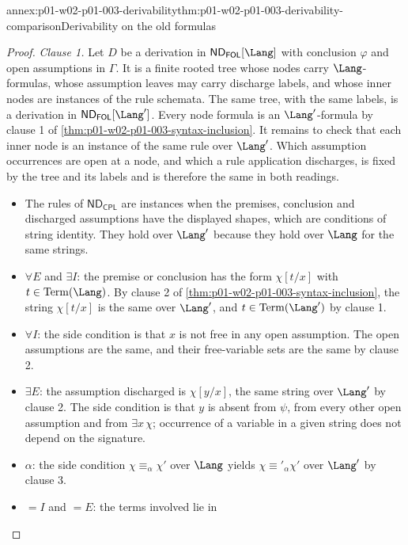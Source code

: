 \begin{annexitem}{annex:p01-w02-p01-003-derivability}{thm:p01-w02-p01-003-derivability-comparison}{Derivability on the old formulas}
\begin{proof}
\emph{Clause 1.} Let \(D\) be a derivation in
\(\mathsf{ND}_{\mathsf{FOL}}[\Lang]\) with conclusion \(\varphi\) and open
assumptions in \(\Gamma\). It is a finite rooted tree whose nodes carry
\(\Lang\)-formulas, whose assumption leaves may carry discharge labels, and
whose inner nodes are instances of the rule schemata. The same tree, with the
same labels, is a derivation in \(\mathsf{ND}_{\mathsf{FOL}}[\Lang']\). Every
node formula is an \(\Lang'\)-formula by clause 1 of
\cref{thm:p01-w02-p01-003-syntax-inclusion}. It remains to check that each
inner node is an instance of the same rule over \(\Lang'\). Which assumption
occurrences are open at a node, and which a rule application discharges, is
fixed by the tree and its labels and is therefore the same in both readings.
\begin{itemize}
  \item The rules of \(\mathsf{ND}_{\mathsf{CPL}}\) are instances when the
        premises, conclusion and discharged assumptions have the displayed
        shapes, which are conditions of string identity. They hold over
        \(\Lang'\) because they hold over \(\Lang\) for the same strings.
  \item \(\forall E\) and \(\exists I\): the premise or conclusion has the
        form \(\chi[t/x]\) with \(t\in\operatorname{Term}(\Lang)\). By
        clause 2 of \cref{thm:p01-w02-p01-003-syntax-inclusion}, the string
        \(\chi[t/x]\) is the same over \(\Lang'\), and
        \(t\in\operatorname{Term}(\Lang')\) by clause 1.
  \item \(\forall I\): the side condition is that \(x\) is not free in any
        open assumption. The open assumptions are the same, and their
        free-variable sets are the same by clause 2.
  \item \(\exists E\): the assumption discharged is \(\chi[y/x]\), the
        same string over \(\Lang'\) by clause 2. The side condition is that
        \(y\) is absent from \(\psi\), from every other open assumption and
        from \(\exists x\,\chi\); occurrence of a variable in a given string
        does not depend on the signature.
  \item \(\alpha\): the side condition \(\chi\equiv_\alpha\chi'\) over
        \(\Lang\) yields \(\chi\equiv'_\alpha\chi'\) over \(\Lang'\) by
        clause 3.
  \item \(=I\) and \(=E\): the terms involved lie in

\end{itemize}
\end{proof}
\end{annexitem}

